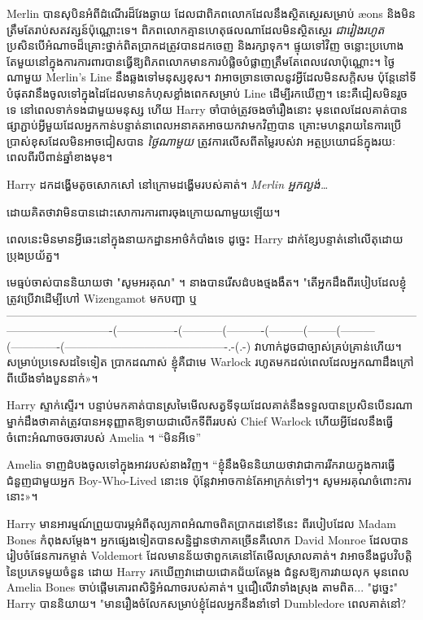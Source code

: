 Merlin បានសុបិនអំពីដំណើរដ៏វែងឆ្ងាយ ដែលជាពិភពលោកដែលនឹងស្ថិតស្ថេរសម្រាប់ æons និងមិនត្រឹមតែរាប់សតវត្សន៍ប៉ុណ្ណោះទេ។ ពិភពលោកគ្មានហេតុផលណាដែលមិនស្ថិតស្ថេរ \emph{ជារៀងរហូត} ប្រសិនបើអំណាចដ៏គ្រោះថ្នាក់ពិតប្រាកដត្រូវបានដកចេញ និងរក្សាទុក។ ផ្ទុយទៅវិញ ចន្លោះប្រហោងតែមួយនៅក្នុងការការពារបានធ្វើឱ្យពិភពលោកមានការបំផ្លិចបំផ្លាញត្រឹមតែពេលវេលាប៉ុណ្ណោះ។ ថ្ងៃណាមួយ Merlin's Line នឹងឆ្លងទៅមនុស្សខុស។ វាអាចច្រានចោលនូវអ្វីដែលមិនសក្តិសម ប៉ុន្តែនៅទីបំផុតវានឹងចូលទៅក្នុងដៃដែលមានកំហុសខ្លាំងពេកសម្រាប់ Line ដើម្បីរកឃើញ។ នេះគឺជៀសមិនរួចទេ នៅពេលទាក់ទងជាមួយមនុស្ស ហើយ Harry ចាំបាច់ត្រូវចងចាំរឿងនោះ មុនពេលដែលគាត់បានផ្សាភ្ជាប់អ្វីមួយដែលអ្នកកាន់បន្ទាត់នាពេលអនាគតអាចយកវាមកវិញបាន គ្រោះមហន្តរាយនៃការប្រើប្រាស់ខុសដែលមិនអាចជៀសបាន \emph{ថ្ងៃណាមួយ} ត្រូវការលើសពីតម្លៃរបស់វា អត្ថប្រយោជន៍ក្នុងរយៈពេលពីរបីពាន់ឆ្នាំខាងមុខ។

Harry ដកដង្ហើមតូចសោកសៅ នៅក្រោមដង្ហើមរបស់គាត់។ \emph{Merlin អ្នកល្ងង់…}

ដោយគិតថាវាមិនបានដោះសោការការពារចុងក្រោយណាមួយឡើយ។

ពេលនេះមិនមានអ្វីឆេះនៅក្នុងនាយកដ្ឋានអាថ៌កំបាំងទេ ដូច្នេះ Harry ដាក់ខ្សែបន្ទាត់នៅលើតុដោយប្រុងប្រយ័ត្ន។

មេធ្មប់ចាស់បាននិយាយថា "សូមអរគុណ" ។ នាងបានរើសដំបងថ្មងងឹត។ "តើអ្នកដឹងពីរបៀបដែលខ្ញុំត្រូវប្រើវាដើម្បីហៅ Wizengamot មកបញ្ជា ឬ----------------------------------------------------------------------------------------------------------------------------------------(----------------(-----------(----------(---------(--------(---------(-------------(-------------------------------------------.-(.-) វាហាក់ដូចជាច្បាស់គ្រប់គ្រាន់ហើយ។ សម្រាប់​ប្រទេស​ដទៃ​ទៀត ប្រាកដ​ណាស់ ខ្ញុំ​គឺ​ជា​មេ​ Warlock រហូត​មក​ដល់​ពេល​ដែល​អ្នក​ណា​ដឹង​ក្រៅ​ពី​យើង​ទាំង​បួន​នាក់»។

Harry ស្ទាក់ស្ទើរ។ បន្ទាប់មកគាត់បានស្រមៃមើលសត្វទីទុយដែលគាត់នឹងទទួលបានប្រសិនបើនរណាម្នាក់ដឹងថាគាត់ត្រូវបានអនុញ្ញាតឱ្យទាយជាលើកទីពីររបស់ Chief Warlock ហើយអ្វីដែលនឹងធ្វើចំពោះអំណាចចរចារបស់ Amelia ។ “មិនអីទេ”

Amelia ទាញដំបងចូលទៅក្នុងអាវរបស់នាងវិញ។ “ខ្ញុំនឹងមិននិយាយថាវាជាការរីករាយក្នុងការធ្វើជំនួញជាមួយអ្នក Boy-Who-Lived នោះទេ ប៉ុន្តែវាអាចកាន់តែអាក្រក់ទៅៗ។ សូម​អរគុណ​ចំពោះ​ការ​នោះ»។

Harry មាន​អារម្មណ៍​ព្រួយ​បារម្ភ​អំពី​តុល្យភាព​អំណាច​ពិត​ប្រាកដ​នៅ​ទីនេះ ពី​របៀប​ដែល Madam Bones កំពុង​សម្ដែង។ អ្នកផ្សេងទៀតបានសន្និដ្ឋានថាភាគច្រើនគឺលោក David Monroe ដែលបានរៀបចំផែនការកម្ចាត់ Voldemort ដែលមានន័យថាពួកគេនៅតែមើលស្រាលគាត់។ វាអាចនឹងជួបវិបត្តិនៃប្រភេទមួយចំនួន ដោយ Harry រកឃើញវាដោយជោគជ័យតែម្តង ជំនួសឱ្យការវាយលុក មុនពេល Amelia Bones ចាប់ផ្តើមគោរពសិទ្ធិអំណាចរបស់គាត់។ ឬជឿលើវាទាំងស្រុង តាមពិត... "ដូច្នេះ" Harry បាននិយាយ។ "មានរឿងចំលែកសម្រាប់ខ្ញុំដែលអ្នកនឹងនាំទៅ Dumbledore ពេលគាត់នៅ?

